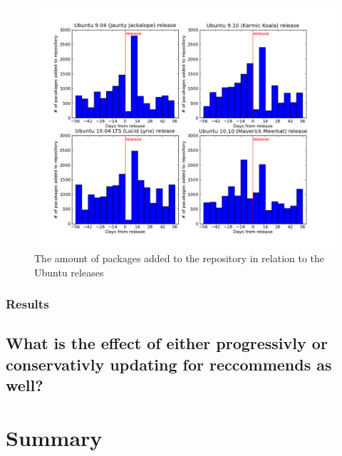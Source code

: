 \begin{figure}[htp]
\begin{center}
  \includegraphics[width=\textwidth]{ubuntusimulationpics/releasedatepacakges}
  \caption[labelInTOC]{The amount of packages added to the repository in relation to the Ubuntu releases}
  \label{ubuntuSchedule}
\end{center}
\end{figure}


\subsubsection{Results}

\subsection{What is the effect of either progressivly or conservativly updating for reccommends as well?}


\section{Summary}
